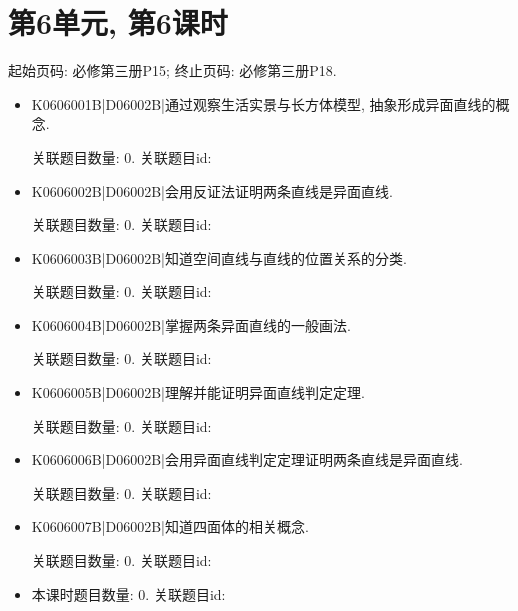 \section*{第6单元, 第6课时}
起始页码: 必修第三册P15; 终止页码: 必修第三册P18.
\begin{itemize}
\item K0606001B|D06002B|通过观察生活实景与长方体模型, 抽象形成异面直线的概念.

关联题目数量: 0. 关联题目id: 

\item K0606002B|D06002B|会用反证法证明两条直线是异面直线.

关联题目数量: 0. 关联题目id: 

\item K0606003B|D06002B|知道空间直线与直线的位置关系的分类.

关联题目数量: 0. 关联题目id: 

\item K0606004B|D06002B|掌握两条异面直线的一般画法.

关联题目数量: 0. 关联题目id: 

\item K0606005B|D06002B|理解并能证明异面直线判定定理.

关联题目数量: 0. 关联题目id: 

\item K0606006B|D06002B|会用异面直线判定定理证明两条直线是异面直线.

关联题目数量: 0. 关联题目id: 

\item K0606007B|D06002B|知道四面体的相关概念.

关联题目数量: 0. 关联题目id: 

\item 本课时题目数量: 0. 关联题目id: 

\end{itemize}

